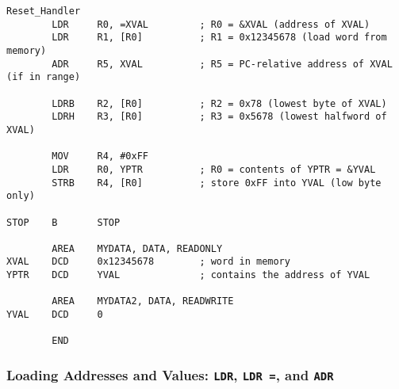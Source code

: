 \begin{lstlisting}[caption={Examples of Load and Store Instructions}]
Reset_Handler
        LDR     R0, =XVAL         ; R0 = &XVAL (address of XVAL)
        LDR     R1, [R0]          ; R1 = 0x12345678 (load word from memory)
        ADR     R5, XVAL          ; R5 = PC-relative address of XVAL (if in range)

        LDRB    R2, [R0]          ; R2 = 0x78 (lowest byte of XVAL)
        LDRH    R3, [R0]          ; R3 = 0x5678 (lowest halfword of XVAL)

        MOV     R4, #0xFF
        LDR     R0, YPTR          ; R0 = contents of YPTR = &YVAL
        STRB    R4, [R0]          ; store 0xFF into YVAL (low byte only)

STOP    B       STOP

        AREA    MYDATA, DATA, READONLY
XVAL    DCD     0x12345678        ; word in memory
YPTR    DCD     YVAL              ; contains the address of YVAL

        AREA    MYDATA2, DATA, READWRITE
YVAL    DCD     0

        END
\end{lstlisting}
\subsubsection{Loading Addresses and Values: \texttt{LDR}, \texttt{LDR =}, and \texttt{ADR}}

